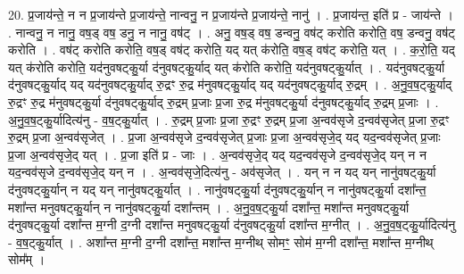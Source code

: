 \documentclass[17pt]{extarticle}
\begin{document}
20. प्र॒जाय॑न्ते॒ न न प्र॒जाय॑न्ते प्र॒जाय॑न्ते॒ नान्वनु॒ न प्र॒जाय॑न्ते प्र॒जाय॑न्ते॒ नानु॑ । . प्र॒जाय॑न्त॒ इति॑ प्र - जाय॑न्ते । . नान्वनु॒ न नानु॒ वष॒ड् वष॒ डनु॒ न नानु॒ वष॑ट् । . अनु॒ वष॒ड् वष॒ डन्वनु॒ वष॑ट् करोति करोति॒ वष॒ डन्वनु॒ वष॑ट् करोति । . वष॑ट् करोति करोति॒ वष॒ड् वष॑ट् करोति॒ यद् यत् क॑रोति॒ वष॒ड् वष॑ट् करोति॒ यत् । . क॒रो॒ति॒ यद् यत् क॑रोति करोति॒ यद॑नुवषट्कु॒र्या द॑नुवषट्कु॒र्याद् यत् क॑रोति करोति॒ यद॑नुवषट्कु॒र्यात् । . यद॑नुवषट्कु॒र्या द॑नुवषट्कु॒र्याद् यद् यद॑नुवषट्कु॒र्याद् रु॒द्रꣳ रु॒द्र म॑नुवषट्कु॒र्याद् यद् यद॑नुवषट्कु॒र्याद् रु॒द्रम् । . अ॒नु॒व॒ष॒ट्कु॒र्याद् रु॒द्रꣳ रु॒द्र म॑नुवषट्कु॒र्या द॑नुवषट्कु॒र्याद् रु॒द्रम् प्र॒जाः प्र॒जा रु॒द्र म॑नुवषट्कु॒र्या द॑नुवषट्कु॒र्याद् रु॒द्रम् प्र॒जाः । . अ॒नु॒व॒ष॒ट्कु॒र्यादित्य॑नु - व॒ष॒ट्कु॒र्यात् । . रु॒द्रम् प्र॒जाः प्र॒जा रु॒द्रꣳ रु॒द्रम् प्र॒जा अ॒न्वव॑सृजे द॒न्वव॑सृजेत् प्र॒जा रु॒द्रꣳ रु॒द्रम् प्र॒जा अ॒न्वव॑सृजेत् । . प्र॒जा अ॒न्वव॑सृजे द॒न्वव॑सृजेत् प्र॒जाः प्र॒जा अ॒न्वव॑सृजे॒द् यद् यद॒न्वव॑सृजेत् प्र॒जाः प्र॒जा अ॒न्वव॑सृजे॒द् यत् । . प्र॒जा इति॑ प्र - जाः । . अ॒न्वव॑सृजे॒द् यद् यद॒न्वव॑सृजे द॒न्वव॑सृजे॒द् यन् न न यद॒न्वव॑सृजे द॒न्वव॑सृजे॒द् यन् न । . अ॒न्वव॑सृजे॒दित्य॑नु - अव॑सृजेत् । . यन् न न यद् यन् नानु॑वषट्कु॒र्या द॑नुवषट्कु॒र्यान् न यद् यन् नानु॑वषट्कु॒र्यात् । . नानु॑वषट्कु॒र्या द॑नुवषट्कु॒र्यान् न नानु॑वषट्कु॒र्या दशा᳚न्त॒ मशा᳚न्त मनुवषट्कु॒र्यान् न नानु॑वषट्कु॒र्या दशा᳚न्तम् । . अ॒नु॒व॒ष॒ट्कु॒र्या दशा᳚न्त॒ मशा᳚न्त मनुवषट्कु॒र्या द॑नुवषट्कु॒र्या दशा᳚न्त म॒ग्नी द॒ग्नी दशा᳚न्त मनुवषट्कु॒र्या द॑नुवषट्कु॒र्या दशा᳚न्त म॒ग्नीत् । . अ॒नु॒व॒ष॒ट्कु॒र्यादित्य॑नु - व॒ष॒ट्कु॒र्यात् । . अशा᳚न्त म॒ग्नी द॒ग्नी दशा᳚न्त॒ मशा᳚न्त म॒ग्नीथ् सोमꣳ॒॒ सोम॑ म॒ग्नी दशा᳚न्त॒ मशा᳚न्त म॒ग्नीथ् सोम᳚म् । \newline
\end{document}
